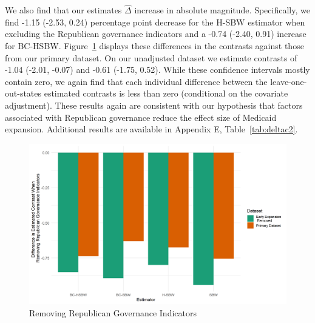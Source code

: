 \documentclass{article}
\begin{document}
We also find that our estimates $\hat{\Delta}$ increase in absolute magnitude. Specifically, we find -1.15 (-2.53, 0.24) percentage point decrease for the H-SBW estimator when excluding the Republican governance indicators and a -0.74 (-2.40, 0.91) increase for BC-HSBW. Figure~\ref{fig:repub} displays these differences in the contrasts against those from our primary dataset. On our unadjusted dataset we estimate contrasts of -1.04 (-2.01, -0.07) and -0.61 (-1.75, 0.52). While these confidence intervals mostly contain zero, we again find that each individual difference between the leave-one-out-states estimated contrasts is less than zero (conditional on the covariate adjustment). These results again are consistent with our hypothesis that factors associated with Republican governance reduce the effect size of Medicaid expansion. Additional results are available in Appendix E, Table~\ref{tab:deltac2}. 

\begin{figure}
\begin{center}
    \caption{Removing Republican Governance Indicators}
    \label{fig:repub}
    \includegraphics[scale=0.6]{01_Plots/repub-diff-c1c2.png}
\end{center}
\end{figure}
\end{document}
